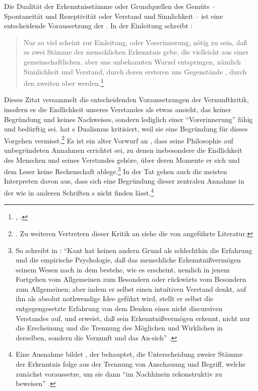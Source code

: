 Die Dualität der Erkenntnisstämme oder Grundquellen des Gemüts -- Spontaneität
und Rezeptivität oder Verstand und Sinnlichkeit -- ist eine entscheidende
Voraussetzung der . In der Einleitung schreibt
:
\begin{quote}
Nur so viel scheint zur Einleitung, oder Vorerinnerung, nötig zu sein, daß es
zwei Stämme der menschlichen Erkenntnis gebe, die vielleicht aus einer
gemeinschaftlichen, aber uns unbekannten Wurzel entspringen, nämlich
Sinnlichkeit und Verstand, durch deren ersteren uns Gegenstände ,
durch den zweiten aber 
werden.\footnote{\cite[][B 29]{Kant:KritikderreinenVernunft2003},
\cite[][III: 46.6--11]{Kant:GesammelteWerke1900ff.}.}
\end{quote}
Dieses Zitat versammelt die entscheidenden Voraussetzungen der Vernunftkritik, insofern es
die Endlichkeit unseres Verstandes als etwas ansieht, das keiner Begründung und
keines Nachweises, sondern lediglich einer \enquote{Vorerinnerung} fähig und
bedürftig sei. 
hat s Dualismus kritisiert, weil sie eine Begründung für
dieses Vorgehen
vermisst.\footnote{\cite[Vgl.][\pno~1\,f.]{Gloy:DieKantischeDifferenzvonBegriffundAnschauungundihreBegruendung1984}.
Zu weiteren Vertretern dieser Kritik an  siehe die von
\textcite[vgl.][Anm. 3 auf S.~66\,f.]{Heidemann:AnschauungundBegriff2002}
angeführte Literatur.} Es ist ein alter Vorwurf an , dass seine
Philosophie auf unbegründeten Annahmen errichtet sei, zu denen insbesondere die
Endlichkeit des Menschen und seines Verstandes gehöre, über deren Momente er
sich und dem Leser keine Rechenschaft ablege.\footnote{So schreibt
 in : \enquote{Kant
hat keinen andern Grund als schlechthin die Erfahrung und die empirische
Psychologie, daß das menschliche Erkenntnißvermögen seinem Wesen nach in dem
bestehe, wie es erscheint, nemlich in jenem Fortgehen vom Allgemeinen zum
Besondern oder rückwärts vom Besondern zum Allgemeinen; aber indem er selbst
einen intuitiven Verstand denkt, auf ihn als absolut nothwendige Idee geführt
wird, stellt er selbst die entgegengesetzte Erfahrung von dem Denken eines nicht
discursiven Verstandes auf, und erweist, daß sein Erkenntnißvermögen erkennt,
nicht nur die Erscheinung und die Trennung des Möglichen und Wirklichen in
derselben, sondern die Vernunft und das An-sich} \parencite[][IV:
341.21--29]{Hegel:GesammelteWerke}.} In der Tat gehen auch die meisten
Interpreten davon aus, dass sich eine Begründung dieser zentralen Annahme in der
 wie in anderen Schriften
s nicht finden lässt.\footnote{Eine Ausnahme bildet
, der behauptet, die
Unterscheidung zweier Stämme der Erkenntnis folge aus der Trennung von
Anschauung und Begriff, welche  zunächst voraussetze, um
sie dann \enquote{im Nachhinein rekonstruktiv zu beweisen}
\parencite[][69]{Heidemann:AnschauungundBegriff2002}.}

